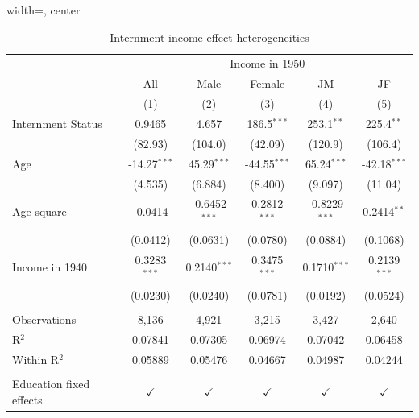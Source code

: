\documentclass{beamer}
\begin{document}
\begin{frame}
  \begin{table}[htbp]
     \caption{\label{tbl:reghet} Internment income effect heterogeneities}
     \begin{adjustbox}{width=\textwidth, center}
     \begin{tabular}{lccccc}
        \toprule
         & \multicolumn{5}{c}{Income in 1950}\\
                                & All            & Male            & Female         & JM              & JF \\   
                                & (1)            & (2)             & (3)            & (4)             & (5)\\  
        \midrule 
        Internment Status       & 0.9465         & 4.657           & 186.5$^{***}$  & 253.1$^{**}$    & 225.4$^{**}$\\   
                                & (82.93)        & (104.0)         & (42.09)        & (120.9)         & (106.4)\\   
        Age                     & -14.27$^{***}$ & 45.29$^{***}$   & -44.55$^{***}$ & 65.24$^{***}$   & -42.18$^{***}$\\   
                                & (4.535)        & (6.884)         & (8.400)        & (9.097)         & (11.04)\\   
        Age square              & -0.0414        & -0.6452$^{***}$ & 0.2812$^{***}$ & -0.8229$^{***}$ & 0.2414$^{**}$\\   
                                & (0.0412)       & (0.0631)        & (0.0780)       & (0.0884)        & (0.1068)\\   
        Income in 1940          & 0.3283$^{***}$ & 0.2140$^{***}$  & 0.3475$^{***}$ & 0.1710$^{***}$  & 0.2139$^{***}$\\   
                                & (0.0230)       & (0.0240)        & (0.0781)       & (0.0192)        & (0.0524)\\   
         \\
        Observations            & 8,136          & 4,921           & 3,215          & 3,427           & 2,640\\  
        R$^2$                   & 0.07841        & 0.07305         & 0.06974        & 0.07042         & 0.06458\\  
        Within R$^2$            & 0.05889        & 0.05476         & 0.04667        & 0.04987         & 0.04244\\  
         \\
        Education fixed effects & $\checkmark$   & $\checkmark$    & $\checkmark$   & $\checkmark$    & $\checkmark$\\   
        \bottomrule
     \end{tabular}
     \end{adjustbox}
    \end{table}
\end{frame}
\end{document}
